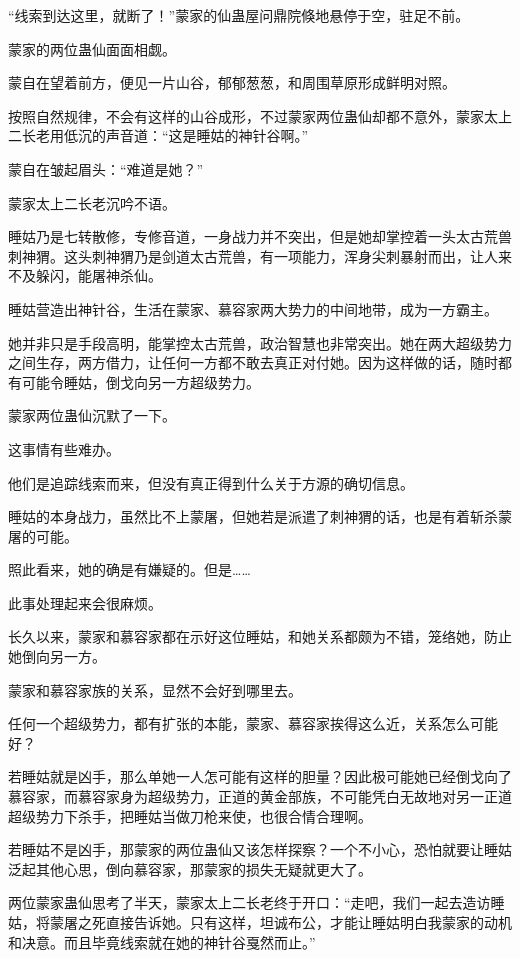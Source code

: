 
\begin{this_body}

“线索到达这里，就断了！”蒙家的仙蛊屋问鼎院倏地悬停于空，驻足不前。

蒙家的两位蛊仙面面相觑。

蒙自在望着前方，便见一片山谷，郁郁葱葱，和周围草原形成鲜明对照。

按照自然规律，不会有这样的山谷成形，不过蒙家两位蛊仙却都不意外，蒙家太上二长老用低沉的声音道：“这是睡姑的神针谷啊。”

蒙自在皱起眉头：“难道是她？”

蒙家太上二长老沉吟不语。

睡姑乃是七转散修，专修音道，一身战力并不突出，但是她却掌控着一头太古荒兽刺神猬。这头刺神猬乃是剑道太古荒兽，有一项能力，浑身尖刺暴射而出，让人来不及躲闪，能屠神杀仙。

睡姑营造出神针谷，生活在蒙家、慕容家两大势力的中间地带，成为一方霸主。

她并非只是手段高明，能掌控太古荒兽，政治智慧也非常突出。她在两大超级势力之间生存，两方借力，让任何一方都不敢去真正对付她。因为这样做的话，随时都有可能令睡姑，倒戈向另一方超级势力。

蒙家两位蛊仙沉默了一下。

这事情有些难办。

他们是追踪线索而来，但没有真正得到什么关于方源的确切信息。

睡姑的本身战力，虽然比不上蒙屠，但她若是派遣了刺神猬的话，也是有着斩杀蒙屠的可能。

照此看来，她的确是有嫌疑的。但是……

此事处理起来会很麻烦。

长久以来，蒙家和慕容家都在示好这位睡姑，和她关系都颇为不错，笼络她，防止她倒向另一方。

蒙家和慕容家族的关系，显然不会好到哪里去。

任何一个超级势力，都有扩张的本能，蒙家、慕容家挨得这么近，关系怎么可能好？

若睡姑就是凶手，那么单她一人怎可能有这样的胆量？因此极可能她已经倒戈向了慕容家，而慕容家身为超级势力，正道的黄金部族，不可能凭白无故地对另一正道超级势力下杀手，把睡姑当做刀枪来使，也很合情合理啊。

若睡姑不是凶手，那蒙家的两位蛊仙又该怎样探察？一个不小心，恐怕就要让睡姑泛起其他心思，倒向慕容家，那蒙家的损失无疑就更大了。

两位蒙家蛊仙思考了半天，蒙家太上二长老终于开口：“走吧，我们一起去造访睡姑，将蒙屠之死直接告诉她。只有这样，坦诚布公，才能让睡姑明白我蒙家的动机和决意。而且毕竟线索就在她的神针谷戛然而止。”


\end{this_body}
